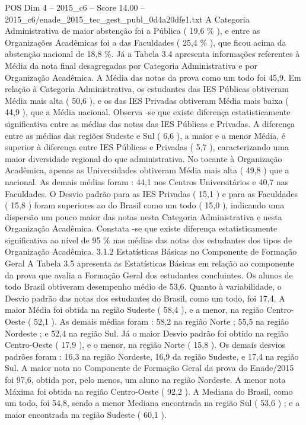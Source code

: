 \begin{textsample}{POS Dim 4 – 2015\_c6 – Score 14.00 – 2015\_c6/enade\_2015\_tec\_gest\_publ\_0d4a20dfe1.txt}
A Categoria Administrativa de maior abstenção foi a Pública ( 19,6 \% ), e entre as Organizações Acadêmicas foi a das Faculdades ( 25,4 \% ), que ficou acima da abstenção nacional de 18,8 \%.
Já a Tabela 3.4 apresenta informações referentes à Média da nota final desagregadas por Categoria Administrativa e por Organização Acadêmica.
A Média das notas da prova como um todo foi 45,9.
Em relação à Categoria Administrativa, os estudantes das IES Públicas obtiveram Média mais alta ( 50,6 ), e os das IES Privadas obtiveram Média mais baixa ( 44,9 ), que a Média nacional.
Observa -se que existe diferença estatisticamente significativa entre as médias das notas das IES Públicas e Privadas.
A diferença entre as médias das regiões Sudeste e Sul ( 6,6 ), a maior e a menor Média, é superior à diferença entre IES Públicas e Privadas ( 5,7 ), caracterizando uma maior diversidade regional do que administrativa.
No tocante à Organização Acadêmica, apenas as Universidades obtiveram Média mais alta ( 49,8 ) que a nacional.
As demais médias foram : 44,1 nos Centros Universitários e 40,7 nas Faculdades.
O Desvio padrão para as IES Privadas ( 15,1 ) e para as Faculdades ( 15,8 ) foram superiores ao do Brasil como um todo ( 15,0 ), indicando uma dispersão um pouco maior das notas nesta Categoria Administrativa e nesta Organização Acadêmica.
Constata -se que existe diferença estatisticamente significativa ao nível de 95 \% nas médias das notas dos estudantes dos tipos de Organização Acadêmica. 3.1.2 Estatísticas Básicas no Componente de Formação Geral A Tabela 3.5 apresenta as Estatísticas Básicas em relação ao componente da prova que avalia a Formação Geral dos estudantes concluintes.
Os alunos de todo Brasil obtiveram desempenho médio de 53,6.
Quanto à variabilidade, o Desvio padrão das notas dos estudantes do Brasil, como um todo, foi 17,4.
A maior Média foi obtida na região Sudeste ( 58,4 ), e a menor, na região Centro-Oeste ( 52,1 ).
As demais médias foram : 58,2 na região Norte ; 55,5 na região Nordeste ; e 52,4 na região Sul.
Já o maior Desvio padrão foi obtido na região Centro-Oeste ( 17,9 ), e o menor, na região Norte ( 15,8 ).
Os demais desvios padrões foram : 16,3 na região Nordeste, 16,9 da região Sudeste, e 17,4 na região Sul.
A maior nota no Componente de Formação Geral da prova do Enade/2015 foi 97,6, obtida por, pelo menos, um aluno na região Nordeste.
A menor nota Máxima foi obtida na região Centro-Oeste ( 92,2 ).
A Mediana do Brasil, como um todo, foi 54,8, sendo a menor Mediana encontrada na região Sul ( 53,6 ) ; e a maior encontrada na região Sudeste ( 60,1 ).

\end{textsample}
